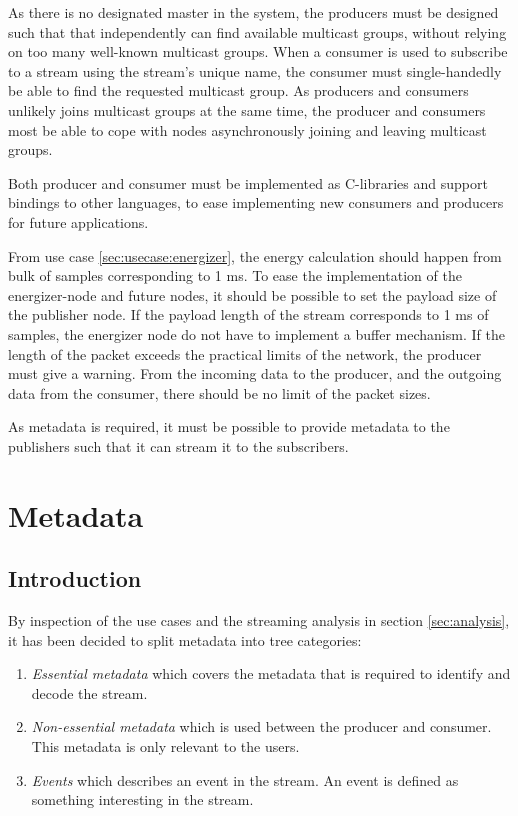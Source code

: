 As there is no designated master in the system, the producers must be designed such that that independently can find available multicast groups, without relying on too many well-known multicast groups. When a consumer is used to subscribe to a stream using the stream's unique name, the consumer must single-handedly be able to find the requested multicast group.
As producers and consumers unlikely joins multicast groups at the same time, the producer and consumers most be able to cope with nodes asynchronously joining and leaving multicast groups.

Both producer and consumer must be implemented as C-libraries and support bindings to other languages, to ease implementing new consumers and producers for future applications.

From use case \ref{sec:usecase:energizer}, the energy calculation should happen from bulk of samples corresponding to 1 ms. To ease the implementation of the energizer-node and future nodes, it should be possible to set the payload size of the publisher node. If the payload length of the stream corresponds to 1 ms of samples, the energizer node do not have to implement a buffer mechanism. If the length of the packet exceeds the practical limits of the network, the producer must give a warning. From the incoming data to the producer, and the outgoing data from the consumer, there should be no limit of the packet sizes.

As metadata is required, it must be possible to provide metadata to the publishers such that it can stream it to the subscribers. 


\section{Metadata}
\subsection{Introduction}

By inspection of the use cases and the streaming analysis in section \ref{sec:analysis}, it has been decided to split metadata into tree categories:
\begin{enumerate}
	\item \textit{Essential metadata} which covers the metadata that is required to identify and decode the stream.
	\item \textit{Non-essential metadata} which is used between the producer and consumer. This metadata is only relevant to the users.
	\item \textit{Events} which describes an event in the stream. An event is defined as something interesting in the stream.
\end{enumerate}

